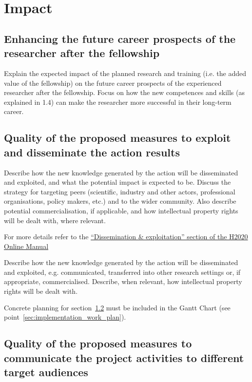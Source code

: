 \section{Impact}
\label{sec:impact}

\subsection{Enhancing the future career prospects of the
researcher after the fellowship}
  \label{sec:impact_researcher}

Explain the expected impact of the planned research and training
(i.e. the added value of the fellowship) on the future career
prospects of the experienced researcher after the fellowship.
Focus on how the new competences and skills (as explained in 1.4)
can make the researcher more successful in their long-term career.

\subsection{Quality of the proposed measures to exploit and
disseminate the action results}
  \label{sec:impact_dissemination}

Describe how the new knowledge generated by the action will be
disseminated and exploited, and what the potential impact is
expected to be. Discuss the strategy for targeting peers
(scientific, industry and other actors, professional
organisations, policy makers, etc.) and to the wider community.
Also describe potential commercialisation, if applicable, and how
intellectual property rights will be dealt with, where relevant.

For more details refer to the
\href{http://ec.europa.eu/research/participants/docs/h2020-funding-guide/grants/grant-management/dissemination-of-results_en.htm}{``Dissemination
\& exploitation'' section of the H2020 Online Manual}

\medskip\noindent
Describe how the new knowledge generated by the action will be
disseminated and exploited, e.g. communicated, transferred into
other research settings or, if appropriate, commercialised.
Describe, when relevant, how intellectual property rights will be
dealt with.

\medskip\noindent
Concrete planning for section~\ref{sec:impact_dissemination} must
be included in the Gantt Chart (see
point~\ref{sec:implementation_work_plan}).


\subsection{Quality of the proposed measures to communicate the
project activities to different target audiences}
\label{sec:impact_communication}

